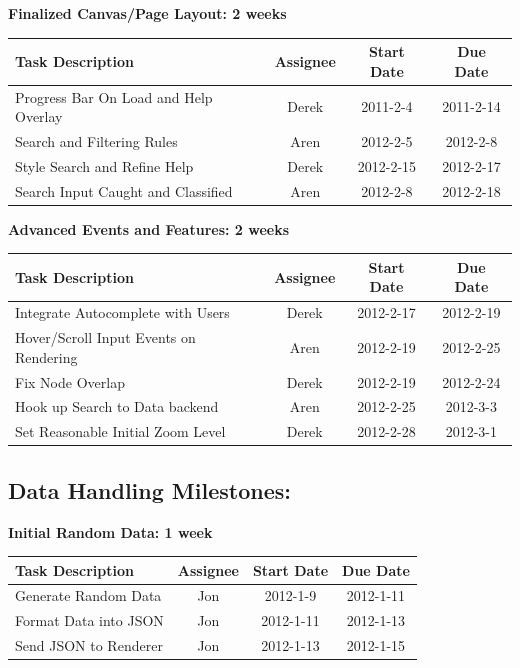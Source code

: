 \documentclass[12pt, letterpaper]{article}
\begin{document}
  \begin{center}
		{\bf Finalized Canvas/Page Layout: 2 weeks}
    \begin{tabular}{| p{8.3cm} || c | c | c | }
      \hline
      Task Description & Assignee & Start Date & Due Date \\
      \hline
		Progress Bar On Load and Help Overlay & Derek & 2011-2-4 & 2011-2-14 \\
	    Search and Filtering Rules & Aren & 2012-2-5 & 2012-2-8 \\
	    Style Search and Refine Help & Derek & 2012-2-15 & 2012-2-17 \\
	    Search Input Caught and Classified & Aren & 2012-2-8 & 2012-2-18 \\
      \hline
    \end{tabular}
  \end{center}

  \begin{center}
		{\bf Advanced Events and Features: 2 weeks}
    \begin{tabular}{| p{8.3cm} || c | c | c | }
      \hline
      Task Description & Assignee & Start Date & Due Date \\
      \hline
        Integrate Autocomplete with Users & Derek & 2012-2-17 & 2012-2-19 \\
	    Hover/Scroll Input Events on Rendering & Aren & 2012-2-19 & 2012-2-25 \\
	    Fix Node Overlap & Derek & 2012-2-19 & 2012-2-24 \\
	    Hook up Search to Data backend & Aren & 2012-2-25 & 2012-3-3 \\
        Set Reasonable Initial Zoom Level & Derek & 2012-2-28 & 2012-3-1 \\
      \hline
    \end{tabular}
  \end{center}

  	\subsection{Data Handling Milestones:}

  \begin{center}
		{\bf Initial Random Data: 1 week}
    \begin{tabular}{| p{8.3cm} || c | c | c | }
      \hline
      Task Description & Assignee & Start Date & Due Date \\
      \hline
	    Generate Random Data & Jon & 2012-1-9 & 2012-1-11 \\
	    Format Data into JSON & Jon & 2012-1-11 & 2012-1-13 \\
	    Send JSON to Renderer & Jon & 2012-1-13 & 2012-1-15 \\
      \hline
    \end{tabular}
  \end{center}
\end{document}
